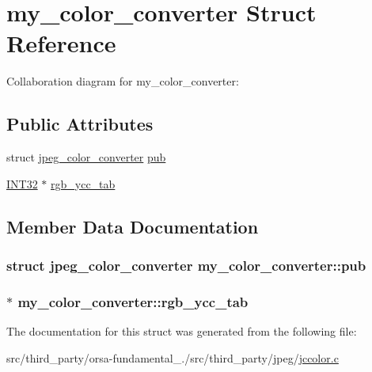 \hypertarget{structmy__color__converter}{}\section{my\+\_\+color\+\_\+converter Struct Reference}
\label{structmy__color__converter}


Collaboration diagram for my\+\_\+color\+\_\+converter\+:
\subsection*{Public Attributes}
\begin{DoxyCompactItemize}
\item 
struct \hyperlink{structjpeg__color__converter}{jpeg\+\_\+color\+\_\+converter} \hyperlink{structmy__color__converter_a6dbeef88bd91b6e62d940ad245474768}{pub}
\item 
\hyperlink{jmorecfg_8h_a0cb58e7e6f0bad369840a52e54a56ae0}{I\+N\+T32} $\ast$ \hyperlink{structmy__color__converter_a783865e631ba6e4e903fcfad6625ec2f}{rgb\+\_\+ycc\+\_\+tab}
\end{DoxyCompactItemize}


\subsection{Member Data Documentation}
\hypertarget{structmy__color__converter_a6dbeef88bd91b6e62d940ad245474768}{}
\subsubsection[{pub}]{\setlength{\rightskip}{0pt plus 5cm}struct {\bf jpeg\+\_\+color\+\_\+converter} my\+\_\+color\+\_\+converter\+::pub}\label{structmy__color__converter_a6dbeef88bd91b6e62d940ad245474768}
\hypertarget{structmy__color__converter_a783865e631ba6e4e903fcfad6625ec2f}{}
\subsubsection[{rgb\+\_\+ycc\+\_\+tab}]{$\ast$ my\+\_\+color\+\_\+converter\+::rgb\+\_\+ycc\+\_\+tab}\label{structmy__color__converter_a783865e631ba6e4e903fcfad6625ec2f}


The documentation for this struct was generated from the following file\+:\begin{DoxyCompactItemize}
\item 
src/third\+\_\+party/orsa-\/fundamental\+\_./src/third\+\_\+party/jpeg/\hyperlink{jccolor_8c}{jccolor.\+c}\end{DoxyCompactItemize}
